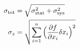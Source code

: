 

\vspace*{\fill}
\centering

\begin{align*}
    \sigma_{\rm tot} &= \sqrt{\sigma_{\rm stat}^2 + \sigma_{\rm sys}^2} \\
    \sigma_{z} &= \sqrt{\sum_{i=1}^{n} \Big( \pdv{f}{x_{i}} \delta x_{i} \Big)^2} 
\end{align*}

\centering
\vspace*{\fill}

